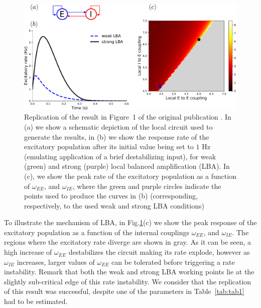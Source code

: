 \begin{figure}[!ht]
 \centering
 \includegraphics[scale=0.4]{figures/figure2.pdf}
 \caption{Replication of the result in Figure~1 of the original publication \cite{joglekar2018inter}. In (a) we show a schematic depiction of the local circuit used to generate the results, in (b) we show the response rate of the excitatory population after its initial value being set to $1$ Hz (emulating application of a brief destabilizing input), for weak (green) and strong (purple) local balanced amplification (LBA). In (c), we show the peak rate of the excitatory population as a function of $\omega_{EE}$, and $\omega_{IE}$, where the green and purple circles indicate the points used to produce the curves in (b) (corresponding, respectively, to the used weak and strong LBA conditions) }\label{fig:fig1}
\end{figure}

To illustrate the mechanism of LBA, in Fig.\ref{fig:fig1}(c) we show the peak response of the excitatory population as a function of the internal couplings $\omega_{EE}$, and $\omega_{IE}$. The regions where the excitatory rate diverge are shown in gray. As it can be seen, a high increase of $\omega_{EE}$ destabilizes the circuit making its rate explode, however as $\omega_{IE}$ increases, larger values of  $\omega_{EE}$ can be tolerated before triggering a rate instability. Remark that both the weak and strong LBA working points lie at the slightly sub-critical edge of this rate instability. We consider that the replication of this result was successful, despite one of the parameters in Table~\ref{tab:tab1} had to be estimated.

